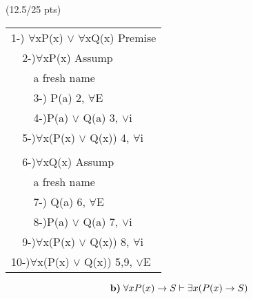 \documentclass[a4paper,12pt]{article}
\begin{document}
\hfill \small{(12.5/25 pts)}\\
\begin{tcolorbox}
\begin{tabular}{|l|l|l|l|l|l|l|l|l|}
\hline
\multicolumn{9}{|l|}{1-) $\forall$xP(x) $\lor$ $\forall$xQ(x) Premise}             \\ \cline{2-8}
 & \multicolumn{7}{l|}{2-)$\forall$xP(x) Assump}        &  \\ \cline{3-7}
 &   & \multicolumn{5}{l|}{ a fresh name} &  &  \\
 &   & \multicolumn{5}{l|}{3-) P(a) 2, $\forall$E} &  &  \\
 &   & \multicolumn{5}{l|}{4-)P(a) $\lor$ Q(a) 3, $\lor$i} &  &  \\ \cline{3-7}
 & \multicolumn{7}{l|}{5-)$\forall$x(P(x) $\lor$ Q(x)) 4, $\forall$i}        &  \\ \cline{2-8}
\multicolumn{9}{|l|}{}             \\ \cline{2-8}
 & \multicolumn{7}{l|}{6-)$\forall$xQ(x) Assump}        &  \\ \cline{3-7}
 &   & \multicolumn{5}{l|}{a fresh name} &  &  \\
 &   & \multicolumn{5}{l|}{7-) Q(a) 6, $\forall$E} &  &  \\
 &   & \multicolumn{5}{l|}{8-)P(a) $\lor$ Q(a) 7, $\lor$i } &  &  \\ \cline{3-7}
 & \multicolumn{7}{l|}{9-)$\forall$x(P(x) $\lor$ Q(x)) 8, $\forall$i}        &  \\ \cline{2-8}
\multicolumn{9}{|l|}{10-)$\forall$x(P(x) $\lor$ Q(x)) 5,9, $\lor$E}             \\ \hline
\end{tabular}
\vspace{1cm} %
\end{tcolorbox}

\begin{equation*}
    \textbf{b)} \; \forall x P(x) \rightarrow S \vdash \exists x (P(x)\rightarrow S)\\
\end{equation*}
\end{document}
